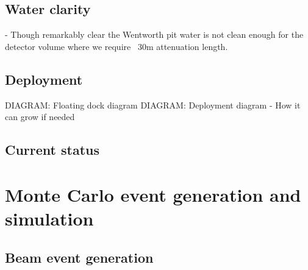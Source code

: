 \subsection{Water clarity} %
\label{sec:chips_detector_water} %

- Though remarkably clear the Wentworth pit water is not clean enough for the detector volume
where we require ~30m attenuation length.

\subsection{Deployment} %
\label{sec:chips_detector_deployment} %

DIAGRAM: Floating dock diagram
DIAGRAM: Deployment diagram
- How it can grow if needed

\subsection{Current status} %
\label{sec:chips_detector_status} %

\section{Monte Carlo event generation and simulation} %
\label{sec:chips_monte_carlo} %

\subsection{Beam event generation} %
\label{sec:chips_monte_carlo_beam} %

